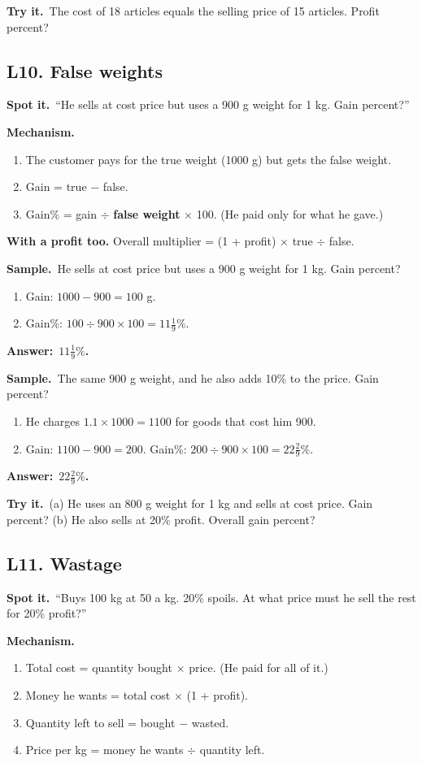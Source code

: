 \documentclass[11pt,a4paper]{article}
\let\oldsubsection\subsection
\renewcommand{\subsection}{\needspace{9\baselineskip}\oldsubsection}
\newcommand{\spot}{\textbf{\color{ember}Spot it.}\ }
\newcommand{\mech}{\textbf{\color{ember}Mechanism.}\ }
\newif\ifkeepsamp
\newcommand{\ans}[1]{\par\nopagebreak\noindent\textbf{\color{ember}Answer:}\ \textbf{#1}\par}
\newcommand{\samp}{\ifkeepsamp\needspace{4\baselineskip}\fi\textbf{\color{ember}Sample.}\ }
\newcommand{\tryit}[1]{\textbf{\color{ember}Try it.}\ #1}
\begin{document}
\tryit The cost of 18 articles equals the selling price of 15 articles. Profit percent?

\subsection{L10. False weights}
\spot ``He sells at cost price but uses a 900 g weight for 1 kg. Gain percent?''

\mech
\begin{enumerate}
\item The customer pays for the true weight (1000 g) but gets the false weight.
\item Gain = true $-$ false.
\item Gain\% = gain $\div$ \textbf{false weight} $\times$ 100. (He paid only for what he gave.)
\end{enumerate}
\textbf{With a profit too.} Overall multiplier = (1 + profit) $\times$ true $\div$ false.

\samp He sells at cost price but uses a 900 g weight for 1 kg. Gain percent?
\begin{enumerate}
\item Gain: $1000 - 900 = 100$ g.
\item Gain\%: $100 \div 900 \times 100 = 11\tfrac19\%$.
\end{enumerate}
\ans{$11\tfrac19\%$.}

\samp The same 900 g weight, and he also adds 10\% to the price. Gain percent?
\begin{enumerate}
\item He charges $1.1 \times 1000 = 1100$ for goods that cost him 900.
\item Gain: $1100 - 900 = 200$. Gain\%: $200 \div 900 \times 100 = 22\tfrac29\%$.
\end{enumerate}
\ans{$22\tfrac29\%$.}

\tryit (a) He uses an 800 g weight for 1 kg and sells at cost price. Gain percent? (b) He also sells at 20\% profit. Overall gain percent?

\subsection{L11. Wastage}
\spot ``Buys 100 kg at 50 a kg. 20\% spoils. At what price must he sell the rest for 20\% profit?''

\mech
\begin{enumerate}
\item Total cost = quantity bought $\times$ price. (He paid for all of it.)
\item Money he wants = total cost $\times$ (1 + profit).
\item Quantity left to sell = bought $-$ wasted.
\item Price per kg = money he wants $\div$ quantity left.
\end{enumerate}
\end{document}
